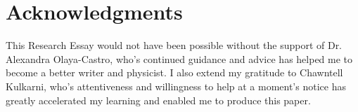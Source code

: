 \documentclass[12pt,a4paper]{article}
\begin{document}
\newpage


\section*{Acknowledgments}
This Research Essay would not have been possible without the support of Dr. Alexandra Olaya-Castro, who's continued guidance and advice has helped me to become a better writer and physicist. I also extend my gratitude to Chawntell Kulkarni, who's attentiveness and willingness to help at a moment's notice has greatly accelerated my learning and enabled me to produce this paper. 


 
 
\end{document}
